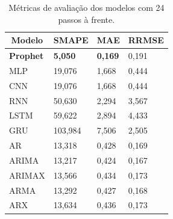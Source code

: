 \begin{table}[!htb]
	\centering
	\caption{Métricas de avaliação dos modelos com 24 passos à frente.}
	\label{tab:metrics}


	
	\begin{tabular}{llll}
		\toprule
		\multicolumn{1}{c}{\textbf{Modelo}} & \multicolumn{1}{c}{\textbf{SMAPE}} & \multicolumn{1}{c}{\textbf{MAE}} & \multicolumn{1}{c}{\textbf{RRMSE}} \\ \midrule
		\textbf{Prophet }                            & \textbf{5,050}                              & \textbf{0,169 }                           & 0,191                              \\
		MLP                                 & 19,076                             & 1,668                            & 0,444                              \\
		CNN                                 & 19,076                             & 1,668                            & 0,444                              \\
		RNN                                 & 50,630                             & 2,294                            & 3,567                              \\
		LSTM                                & 59,622                             & 2,894                            & 4,433                              \\
		GRU                                 & 103,984                            & 7,506                            & 2,505                              \\
		AR                                  & 13,318                             & 0,428                            & 0,169                              \\
		ARIMA                               & 13,217                             & 0,424                            & 0,167                              \\
		ARIMAX                              & 13,566                             & 0,434                            & 0,173                              \\
		ARMA                                & 13,292                             & 0,427                            & 0,168                              \\
		ARX                                 & 13,634                             & 0,436                            & 0,173                              \\

\end{tabular}
\end{table}
